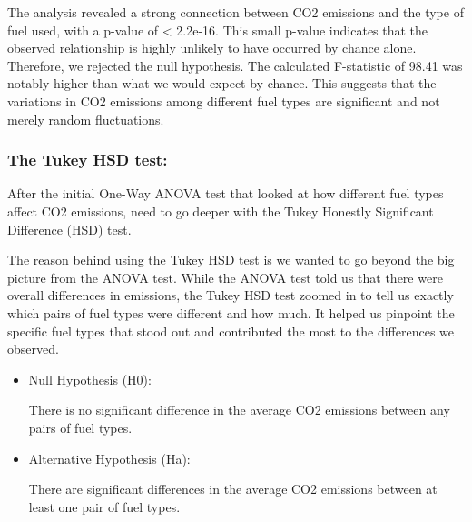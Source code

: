 \documentclass[12pt, a4paper,oneside]{book}
\numberwithin{equation}{section}
\begin{document}
The analysis revealed a strong connection between CO2 emissions and the type of fuel used, with a p-value of < 2.2e-16. This small p-value indicates that the observed relationship is highly unlikely to have occurred by chance alone. Therefore, we rejected the null hypothesis.
The calculated F-statistic of 98.41 was notably higher than what we would expect by chance. This suggests that the variations in CO2 emissions among different fuel types are significant and not merely random fluctuations.


\subsubsection{The Tukey HSD test:}

After the initial One-Way ANOVA test that looked at how different fuel types affect CO2 emissions, need to go deeper with the Tukey Honestly Significant Difference (HSD) test.~\cite{ref10}

The reason behind using the Tukey HSD test is we wanted to go beyond the big picture from the ANOVA test. While the ANOVA test told us that there were overall differences in emissions, the Tukey HSD test zoomed in to tell us exactly which pairs of fuel types were different and how much. It helped us pinpoint the specific fuel types that stood out and contributed the most to the differences we observed.



\begin{itemize}
    \item Null Hypothesis (H0):
    
There is no significant difference in the average CO2 emissions between any pairs of fuel types.
\end{itemize}

\begin{itemize}
    \item Alternative Hypothesis (Ha):
    
There are significant differences in the average CO2 emissions between at least one pair of fuel types.
\end{itemize}
\end{document}
